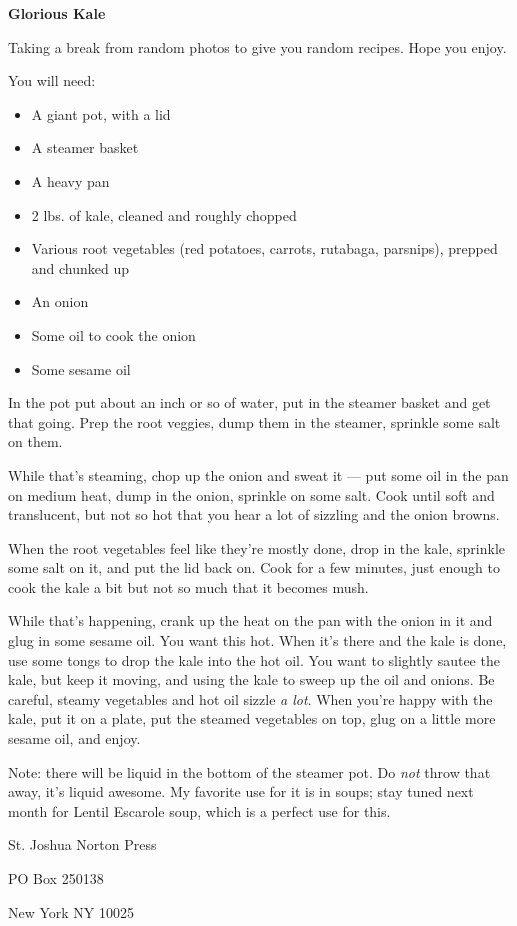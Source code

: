 \documentclass[12pt]{article}
\begin{document}
\newpage
\begin{center}{\bfseries Glorious Kale}\end{center}
{\fontsize{10}{10}\selectfont
Taking a break from random photos to give you random recipes. Hope you enjoy.

You will need:

\begin{itemize}
    \item A giant pot, with a lid
    \item A steamer basket
    \item A heavy pan
    \item 2 lbs. of kale, cleaned and roughly chopped
    \item Various root vegetables (red potatoes, carrots, rutabaga, parsnips), prepped and 
          chunked up
    \item An onion
    \item Some oil to cook the onion
    \item Some sesame oil
\end{itemize}

In the pot put about an inch or so of water, put in the steamer basket and
get that going. Prep the root veggies, dump them in the steamer, sprinkle
some salt on them.

While that's steaming, chop up the onion and sweat it --- put some oil in the
pan on medium heat, dump in the onion, sprinkle on some salt. Cook until
soft and translucent, but not so hot that you hear a lot of sizzling and
the onion browns.

When the root vegetables feel like they're mostly done, drop in the kale,
sprinkle some salt on it, and put the lid back on. Cook for a few minutes,
just enough to cook the kale a bit but not so much that it becomes mush.

While that's happening, crank up the heat on the pan with the onion in
it and glug in some sesame oil. You want this hot. When it's there and
the kale is done, use some tongs to drop the kale into the hot oil. You
want to slightly sautee the kale, but keep it moving, and using the kale
to sweep up the oil and onions. Be careful, steamy vegetables and hot
oil sizzle {\em a lot}. When you're happy with the kale, put it on a
plate, put the steamed vegetables on top, glug on a little more sesame
oil, and enjoy.

Note: there will be liquid in the bottom of the steamer pot. Do {\em not}
throw that away, it's liquid awesome. My favorite use for it is in
soups; stay tuned next month for Lentil Escarole soup, which is a
perfect use for this.
}
\newpage

\thispagestyle{empty}
\vspace*{12cm}
\begin{sideways}
\Large{St. Joshua Norton Press}
\end{sideways}
\begin{sideways}
\Large{PO Box 250138}
\end{sideways}
\begin{sideways}
\Large{New York NY 10025}
\end{sideways}
\end{document}

